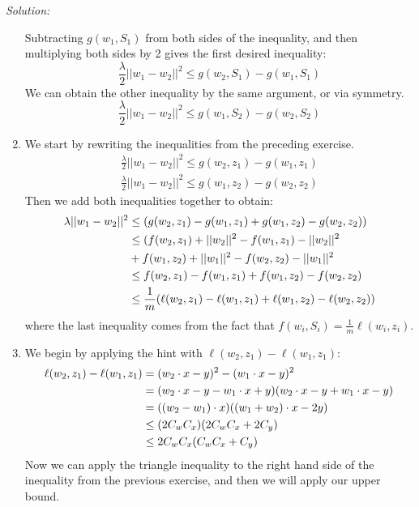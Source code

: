 \documentclass[
10pt, %
a4paper, %
oneside, %
headinclude,footinclude, %
BCOR5mm, %
]{scrartcl}
\newenvironment{solution}
               {\textit{Solution:}}
               {}
\begin{document}
\begin{solution}
\begin{enumerate}
      Subtracting $g(w_1, S_1)$ from both sides of the inequality, and then multiplying both sides by 2 gives the first desired inequality:
      $$\frac{\lambda}{2}||w_1-w_2||^2 \leq g(w_2,S_1)-g(w_1, S_1)$$
      We can obtain the other inequality by the same argument, or via symmetry.
      $$\frac{\lambda}{2}||w_1-w_2||^2 \leq g(w_1,S_2)-g(w_2, S_2)$$
    \item We start by rewriting the inequalities from the preceding exercise.
      \begin{align*}
        \frac{\lambda}{2}||w_1-w_2||^2 \leq g(w_2, z_1)-g(w_1, z_1) \\
        \frac{\lambda}{2}||w_1-w_2||^2 \leq g(w_1, z_2)-g(w_2, z_2)
      \end{align*}
      Then we add both inequalities together to obtain:
      \begin{align*}
        \lambda ||w_1-w_2||^2 &\leq (g(w_2,z_1)-g(w_1,z_1)+g(w_1,z_2)-g(w_2,z_2)) \\
        \hphantom{\lambda ||w_1-w_2||^2} &\leq (f(w_2,z_1) + ||w_2||^2 -f(w_1,z_1) - ||w_2||^2 \\
        \hphantom{\lambda ||w_1-w_2||^2}&+f(w_1,z_2) + ||w_1||^2-f(w_2,z_2) - ||w_1||^2 \\
        &\leq f(w_2,z_1)-f(w_1,z_1)+f(w_1,z_2)-f(w_2,z_2) \\
        &\leq \frac{1}{m} (\ell(w_2,z_1)-\ell(w_1,z_1)+\ell(w_1,z_2)-\ell(w_2,z_2))
      \end{align*}
      where the last inequality comes from the fact that $f(w_i,S_i) = \frac{1}{m}\ell(w_i, z_i)$.
    \item We begin by applying the hint with $\ell(w_2,z_1) - \ell(w_1,z_1)$:
        \begin{align*}
          \ell(w_2,z_1) - \ell(w_1,z_1) &= (w_2\cdot x - y)^2 - (w_1\cdot x - y)^2 \\
          \hphantom{\ell(w_2,z_1) - \ell(w_1,z_1)} &= (w_2\cdot x - y - w_1\cdot x + y)(w_2\cdot x - y + w_1\cdot x - y) \\
          \hphantom{\ell(w_2,z_1) - \ell(w_1,z_1)} &= ((w_2 - w_1)\cdot x)((w_1 + w_2)\cdot x - 2y) \\
          \hphantom{\ell(w_2,z_1) - \ell(w_1,z_1)} &\leq (2C_wC_x)(2C_wC_x+2C_y) \\
          \hphantom{\ell(w_2,z_1) - \ell(w_1,z_1)} &\leq 2C_wC_x(C_wC_x + C_y)
        \end{align*}
        Now we can apply the triangle inequality to the right hand side of the inequality from the previous exercise, and then we will apply our upper bound.

\end{enumerate}
\end{solution}
\end{document}
